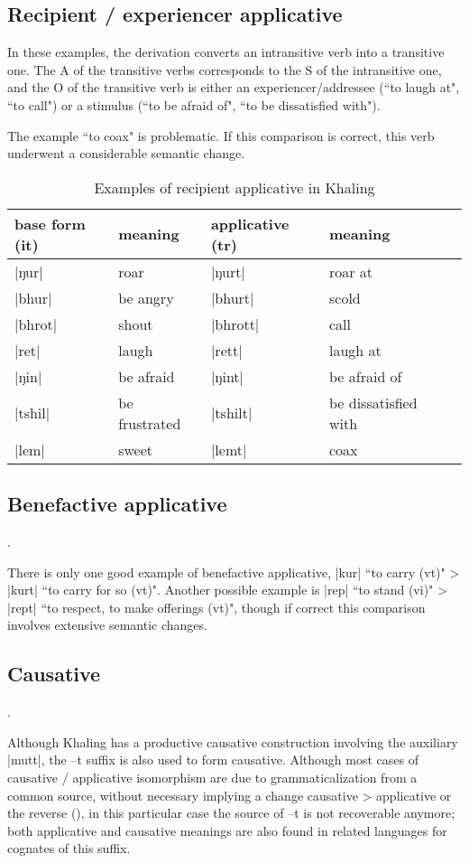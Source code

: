 \documentclass[oldfontcommands,oneside,a4paper,11pt]{article}
\newcommand{\ipa}[1]{{\phon #1}} %
\begin{document}
\subsection{Recipient / experiencer applicative}

In these examples, the derivation converts an intransitive verb into a transitive one. The A of the transitive verbs corresponds to the S of the intransitive one, and the O of the transitive verb is either an experiencer/addressee (``to laugh at", ``to call") or a stimulus (``to be afraid of", ``to be dissatisfied with").

The example ``to coax" is problematic.  If this comparison is correct, this verb underwent a considerable semantic change.
\begin{table}[H]
\caption{Examples of recipient applicative in Khaling} \label{tab:recipient.appl}
\begin{tabular}{lllll}
\toprule
base form (it) & meaning & applicative (tr) & meaning \\
\midrule
|ŋur| & roar & |ŋurt| &roar at\\
|bhur| & be angry & |bhurt| &scold\\
|bhrot| & shout & |bhrott| & call\\
|ret| & laugh  & |rett| & laugh at\\
|ŋin| & be afraid  & |ŋint| & be afraid of\\
|tshil| & be frustrated  & |tshilt| & be dissatisfied with\\
|lem| & sweet  & |lemt| & coax\\
\bottomrule
\end{tabular}
\end{table}

\subsection{Benefactive applicative}. 

There is only one good example of benefactive applicative, |kur| ``to carry (vt)" > |kurt| ``to carry for so (vt)". Another possible example is |rep| ``to stand (vi)" > |rept| ``to respect, to make offerings (vt)", though if correct this comparison involves extensive semantic changes.

\subsection{Causative}.


Although Khaling has a productive causative construction involving the auxiliary |mutt|, the \ipa{--t} suffix is also used to form causative. Although most cases of causative / applicative isomorphism are due to grammaticalization from a common source, without necessary implying a change causative > applicative or the reverse (\citealt[64]{peterson07appl}), in this particular case the source of \ipa{--t} is not recoverable anymore; both applicative and causative meanings are also found in related languages for cognates of this suffix.
\end{document}
